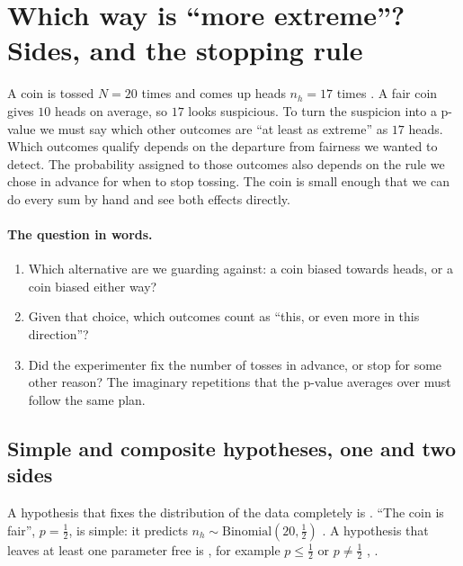 \section{Which way is ``more extreme''? Sides, and the stopping rule}
\label{4a:sec:sides}

A coin is tossed $N=20$ times and comes up heads $n_h=17$ times
. A fair coin gives $10$ heads on average, so $17$ looks
suspicious. To turn the suspicion into a p-value we must say which other
outcomes are ``at least as extreme'' as $17$ heads. Which outcomes qualify depends on the departure from fairness we wanted to
detect. The probability assigned to those outcomes also depends on the rule
we chose in advance for when to stop tossing. The coin is small
enough that we can do every sum by hand and see both effects directly.

\paragraph{The question in words.}
\begin{enumerate}[label=\arabic*.]
  \item Which alternative are we guarding against: a coin biased towards
        heads, or a coin biased either way?
  \item Given that choice, which outcomes count as ``this, or even more in
        this direction''?
  \item Did the experimenter fix the number of tosses in advance, or stop for
        some other reason? The imaginary repetitions that the p-value averages
        over must follow the same plan.
\end{enumerate}

\subsection{Simple and composite hypotheses, one and two sides}
\label{4a:sec:simple-composite}

A hypothesis that fixes the distribution of the data completely is
. ``The coin is fair'', $p=\tfrac12$, is simple: it predicts
$n_h\sim\mathrm{Binomial}(20,\tfrac12)$ . A hypothesis
that leaves at least one parameter free is , for example
$p\le\tfrac12$ or $p\neq\tfrac12$ , .

